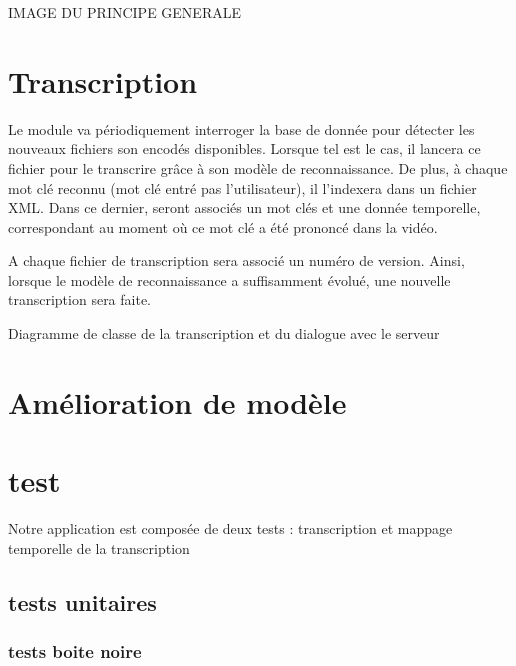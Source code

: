 		IMAGE DU PRINCIPE GENERALE

	
	
	
	\chapter{Transcription}
	Le module va périodiquement interroger la base de donnée pour détecter les nouveaux fichiers son encodés disponibles. Lorsque tel est le cas, il lancera ce fichier pour le transcrire grâce à son modèle de reconnaissance. De plus, à chaque mot clé reconnu (mot clé entré pas l'utilisateur), il l'indexera dans un fichier XML. Dans ce dernier, seront associés un mot clés et une donnée temporelle, correspondant au moment où ce mot clé a été prononcé dans la vidéo.

	A chaque fichier de transcription sera associé un numéro de version. Ainsi, lorsque le modèle de reconnaissance a suffisamment évolué, une nouvelle transcription sera faite.

	Diagramme de classe de la transcription et du dialogue avec le serveur


	
	\chapter{Amélioration de modèle}
	
	
	\chapter{test}
	Notre application est composée de deux tests  :  transcription et mappage temporelle de la transcription

	\section{tests unitaires}

	\subsection{tests boite noire}
	
	
	
	
	
	
